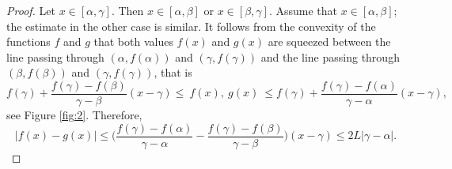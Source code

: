 \documentclass[intlimits,12pt,reqno]{amsart}
\theoremstyle{definition}
\begin{document}
\begin{proof}
Let $x\in [\alpha,\gamma]$. Then $x\in[\alpha,\beta]$ or $x\in[\beta,\gamma]$. Assume that $x\in[\alpha,\beta]$; the estimate in the other case is similar.
It follows from the convexity of the functions $f$ and $g$ that both values $f(x)$ and $g(x)$ are squeezed between the line passing through $(\alpha,f(\alpha))$ and $(\gamma,f(\gamma))$ and the line passing through $(\beta,f(\beta))$ and $(\gamma,f(\gamma))$, that is
$$
f(\gamma)+\frac{f(\gamma)-f(\beta)}{\gamma-\beta}(x-\gamma)\leq \ f(x),\  g(x)\ \leq
f(\gamma)+\frac{f(\gamma)-f(\alpha)}{\gamma-\alpha}(x-\gamma),
$$
see Figure \ref{fig:2}.
Therefore,
$$
|f(x)-g(x)|\leq\Big(\frac{f(\gamma)-f(\alpha)}{\gamma-\alpha}-\frac{f(\gamma)-f(\beta)}{\gamma-\beta}\Big)(x-\gamma)
\leq 2L|\gamma-\alpha|.
$$

\end{proof}
\end{document}
